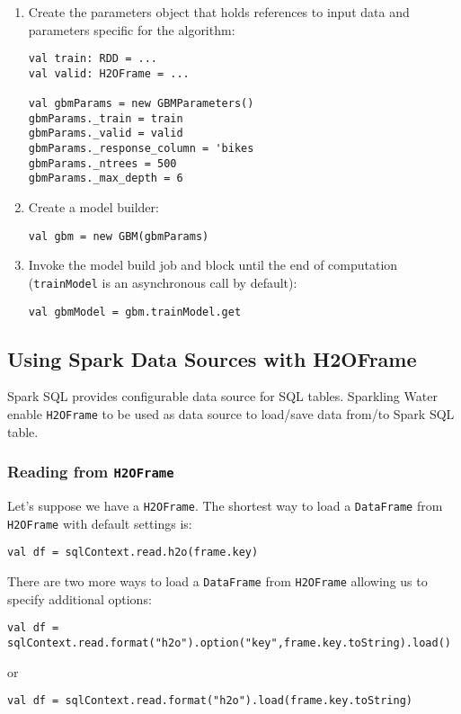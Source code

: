 \begin{enumerate}
\item Create the parameters object that holds references to input data and parameters specific for the algorithm:

\begin{lstlisting}[style=Scala]
val train: RDD = ...
val valid: H2OFrame = ...

val gbmParams = new GBMParameters()
gbmParams._train = train
gbmParams._valid = valid
gbmParams._response_column = 'bikes
gbmParams._ntrees = 500
gbmParams._max_depth = 6
\end{lstlisting}

 \item Create a model builder:
 \begin{lstlisting}[style=Scala]
 val gbm = new GBM(gbmParams)
 \end{lstlisting}
 
 \item Invoke the model build job and block until the end of computation (\texttt{trainModel} is an asynchronous call by default): 
 \begin{lstlisting}[style=Scala]
 val gbmModel = gbm.trainModel.get 
 \end{lstlisting}
 \end{enumerate}

\subsection{Using Spark Data Sources with H2OFrame}
Spark SQL provides configurable data source for SQL tables. Sparkling Water enable \texttt{H2OFrame} to be
used as data source to load/save data from/to Spark SQL table.

\subsubsection{Reading from \texttt{H2OFrame}}

Let's suppose we have a \texttt{H2OFrame}. The shortest way to load a \texttt{DataFrame} from \texttt{H2OFrame} with default settings is:
\begin{lstlisting}[style=Scala]
val df = sqlContext.read.h2o(frame.key)
\end{lstlisting}

There are two more ways to load a \texttt{DataFrame} from \texttt{H2OFrame} allowing us to specify additional options:
\begin{lstlisting}[style=Scala]
val df = sqlContext.read.format("h2o").option("key",frame.key.toString).load()
\end{lstlisting}
or
\begin{lstlisting}[style=Scala]
val df = sqlContext.read.format("h2o").load(frame.key.toString)
\end{lstlisting}

